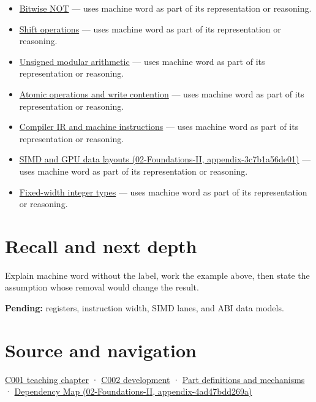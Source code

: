 \begin{itemize}
\tightlist
\item
  \hyperref[appendix-8f38927cfc54]{Bitwise NOT} --- uses machine word as part of its representation or reasoning.
\item
  \hyperref[appendix-73425b25118e]{Shift operations} --- uses machine word as part of its representation or reasoning.
\item
  \hyperref[appendix-c99977d88b33]{Unsigned modular arithmetic} --- uses machine word as part of its representation or reasoning.
\item
  \hyperref[appendix-e12d1b03fefb]{Atomic operations and write contention} --- uses machine word as part of its representation or reasoning.
\item
  \hyperref[appendix-942ad41afb30]{Compiler IR and machine instructions} --- uses machine word as part of its representation or reasoning.
\item
  \href{../02-Foundations-II/main.pdf\#nameddest=appendix-3c7b1a56de01}{SIMD and GPU data layouts (02-Foundations-II, appendix-3c7b1a56de01)} --- uses machine word as part of its representation or reasoning.
\item
  \hyperref[appendix-cc04044b5782]{Fixed-width integer types} --- uses machine word as part of its representation or reasoning.
\end{itemize}

\section{Recall and next depth}\label{appendix-d67a19507dc5-recall-and-next-depth}

Explain machine word without the label, work the example above, then state the assumption whose removal would change the result.

\textbf{Pending:} registers, instruction width, SIMD lanes, and ABI data models.

\section{Source and navigation}\label{appendix-d67a19507dc5-source-and-navigation}

\href{Continuous\%20Notes/Computing\%20Foundations\%20-\%20From\%20Bits\%20to\%20C++\%20and\%20Systems\%20APIs\#From\%20a\%20signal\%20to\%20an\%20interpretation}{C001 teaching chapter} · \href{Continuous\%20Notes/Computing\%20Foundations\%20-\%20From\%20Bits\%20to\%20C++\%20and\%20Systems\%20APIs\#Arithmetic\%20becomes\%20a\%20policy}{C002 development} · \hyperref[appendix-fd090d982a15]{Part definitions and mechanisms} · \href{../02-Foundations-II/main.pdf\#nameddest=appendix-4ad47bdd269a}{Dependency Map (02-Foundations-II, appendix-4ad47bdd269a)}
